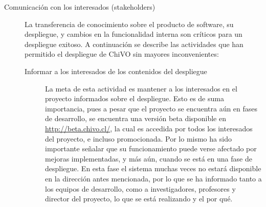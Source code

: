 \begin{description}
	\item [Comunicación con los interesados (stakeholders)] La transferencia de conocimiento sobre el producto de software, su despliegue, y cambios en la funcionalidad interna son críticos para un despliegue exitoso. A continuación se describe las actividades que han permitido el despliegue de ChiVO sin mayores inconvenientes:
		\begin{description}
			\item [Informar a los interesados de los contenidos del despliegue] La meta de esta actividad es mantener a los interesados en el proyecto informados sobre el despliegue. Esto es de suma importancia, pues a pesar que el proyecto se encuentra aún en fases de desarrollo, se encuentra una versión beta\footnotemark{} disponible en \url{http://beta.chivo.cl/}, la cual es accedida por todos los interesados del proyecto, e incluso promocionada. Por lo mismo ha sido importante señalar que su funcionamiento puede verse afectado por mejoras implementadas, y más aún, cuando se está en una fase de despliegue. En esta fase el sistema muchas veces no estará disponible en la dirección antes mencionada, por lo que se ha informado tanto a los equipos de desarrollo, como a investigadores, profesores y director del proyecto, lo que se está realizando y el por qu\'e.


\end{description}
\end{description}
